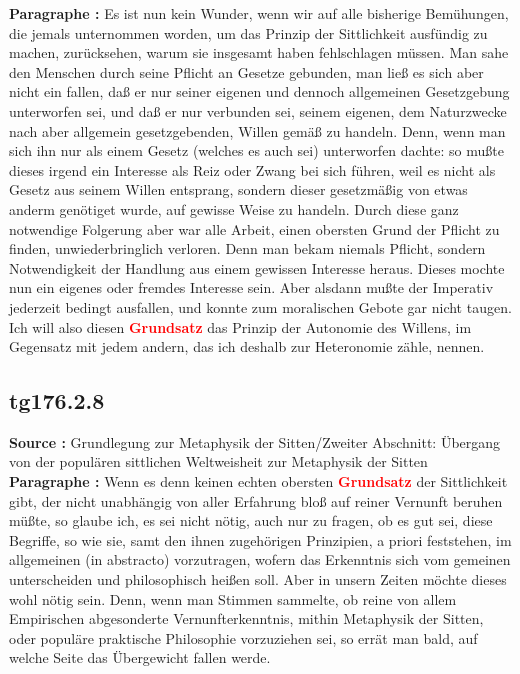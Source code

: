 \documentclass[a4paper,12pt,twoside]{book}
\newcommand{\match}[1]{\textcolor{red}{\textbf{#1}}}
\begin{document}
	\noindent\textbf{Paragraphe : }Es ist nun kein Wunder, wenn wir auf alle bisherige Bemühungen, die jemals unternommen worden, um das Prinzip der Sittlichkeit ausfündig zu machen, zurücksehen, warum sie insgesamt haben fehlschlagen müssen. Man sahe den Menschen durch seine Pflicht an Gesetze gebunden, man ließ es sich aber nicht ein fallen, daß er nur seiner eigenen und dennoch allgemeinen Gesetzgebung unterworfen sei, und daß er nur verbunden sei, seinem eigenen, dem Naturzwecke nach aber allgemein gesetzgebenden, Willen gemäß zu handeln. Denn, wenn man sich ihn nur als einem Gesetz (welches es auch sei) unterworfen dachte: so mußte dieses irgend ein Interesse als Reiz oder Zwang bei sich führen, weil es nicht als Gesetz aus seinem Willen entsprang, sondern dieser gesetzmäßig von etwas anderm genötiget wurde, auf gewisse Weise zu handeln. Durch diese ganz notwendige Folgerung aber war alle Arbeit, einen obersten Grund der Pflicht zu finden, unwiederbringlich verloren. Denn man bekam niemals Pflicht, sondern Notwendigkeit der Handlung aus einem gewissen Interesse heraus.  Dieses mochte nun ein eigenes oder fremdes Interesse sein. Aber alsdann mußte der Imperativ jederzeit bedingt ausfallen, und konnte zum moralischen Gebote gar nicht taugen. Ich will also diesen \match{Grundsatz} das Prinzip der Autonomie des Willens, im Gegensatz mit jedem andern, das ich deshalb zur Heteronomie zähle, nennen. 
	
	\subsection*{tg176.2.8} 
	\textbf{Source : }Grundlegung zur Metaphysik der Sitten/Zweiter Abschnitt: Übergang von der populären sittlichen Weltweisheit zur Metaphysik der Sitten\\  
	
	\noindent\textbf{Paragraphe : }Wenn es denn keinen echten obersten \match{Grundsatz} der Sittlichkeit gibt, der nicht unabhängig von aller Erfahrung bloß auf reiner Vernunft beruhen müßte, so glaube ich, es sei nicht nötig, auch nur zu fragen, ob es gut sei, diese Begriffe, so wie sie, samt den ihnen zugehörigen Prinzipien, a priori feststehen, im allgemeinen (in abstracto) vorzutragen, wofern das Erkenntnis sich vom gemeinen unterscheiden und philosophisch heißen soll. Aber in unsern Zeiten möchte dieses wohl nötig sein. Denn, wenn man Stimmen sammelte, ob reine von allem Empirischen abgesonderte Vernunfterkenntnis, mithin Metaphysik der Sitten, oder populäre praktische Philosophie vorzuziehen sei, so errät man bald, auf welche Seite das Übergewicht fallen werde. 
	
\end{document}
